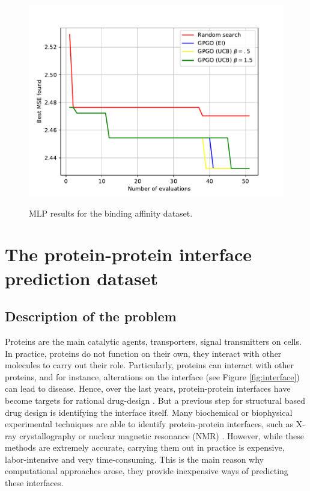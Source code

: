 \documentclass[10pt,a4paper,twoside]{book}
\begin{document}
\begin{figure}
\centering
\caption{MLP results for the binding affinity dataset.}
\includegraphics[scale=0.75]{figures/chapter4/aff/mlp}
\label{fig:affmlp}
\end{figure}

\newpage

\section{The protein-protein interface prediction dataset}

\subsection{Description of the problem}

Proteins are the main catalytic agents, transporters, signal transmitters on cells. In practice, proteins do not function on their own, they interact with other molecules to carry out their role. Particularly, proteins can interact with other proteins, and for instance, alterations on the interface (see Figure \ref{fig:interface}) can lead to disease. Hence, over the last years, protein-protein interfaces have become targets for rational drug-design \cite{Jubb2015}. But a previous step for structural based drug design is identifying the interface itself. Many biochemical or biophysical experimental techniques are able to identify protein-protein interfaces, such as X-ray crystallography \cite{Shi2014} or nuclear magnetic resonance (NMR) \cite{Gobl2014}. However, while these methods are extremely accurate, carrying them out in practice is expensive, labor-intensive and very time-consuming. This is the main reason why computational approaches arose, they provide inexpensive ways of predicting these interfaces.\\
\end{document}
